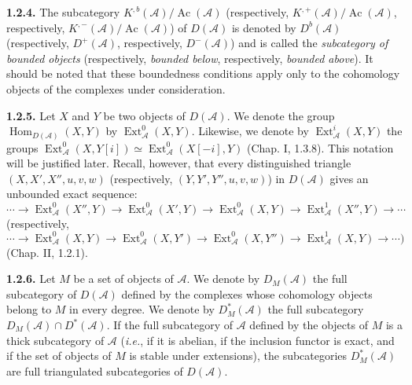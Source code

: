 \clearpage
{}%
\begingroup\small\setlength{\parskip}{0pt}\setlength{\emergencystretch}{1.5em}
\setlength{\abovedisplayskip}{4pt plus 2pt minus 2pt}%
\setlength{\belowdisplayskip}{4pt plus 2pt minus 2pt}%

\noindent\textbf{1.2.4.}\quad
The subcategory $K^{,b}(\mathcal A)/\operatorname{Ac}(\mathcal A)$
(respectively, $K^{,+}(\mathcal A)/\operatorname{Ac}(\mathcal A)$,
respectively, $K^{,-}(\mathcal A)/\operatorname{Ac}(\mathcal A)$) of
$D(\mathcal A)$ is denoted by $D^b(\mathcal A)$ (respectively,
$D^+(\mathcal A)$, respectively, $D^-(\mathcal A)$) and is called the
\emph{subcategory of bounded objects} (respectively, \emph{bounded below},
respectively, \emph{bounded above}). It should be noted that these
boundedness conditions apply only to the cohomology objects of the complexes
under consideration.

\medskip\noindent\textbf{1.2.5.}\quad
Let $X$ and $Y$ be two objects of $D(\mathcal A)$. We denote the group
$\operatorname{Hom}_{D(\mathcal A)}(X,Y)$ by
$\operatorname{Ext}_{\mathcal A}^{0}(X,Y)$. Likewise, we denote by
$\operatorname{Ext}_{\mathcal A}^{i}(X,Y)$ the groups
$\operatorname{Ext}_{\mathcal A}^{0}(X,Y[i])\simeq
\operatorname{Ext}_{\mathcal A}^{0}(X[-i],Y)$ (Chap. I, 1.3.8). This
notation will be justified later. Recall, however, that every distinguished
triangle $(X,X',X'',u,v,w)$ (respectively, $(Y,Y',Y'',u,v,w)$) in
$D(\mathcal A)$ gives an unbounded exact sequence:
\[
\cdots\longrightarrow \operatorname{Ext}_{\mathcal A}^{0}(X'',Y)
\longrightarrow \operatorname{Ext}_{\mathcal A}^{0}(X',Y)
\longrightarrow \operatorname{Ext}_{\mathcal A}^{0}(X,Y)
\longrightarrow \operatorname{Ext}_{\mathcal A}^{1}(X'',Y)
\longrightarrow\cdots
\]
(respectively,
\[
\cdots\longrightarrow \operatorname{Ext}_{\mathcal A}^{0}(X,Y)
\longrightarrow \operatorname{Ext}_{\mathcal A}^{0}(X,Y')
\longrightarrow \operatorname{Ext}_{\mathcal A}^{0}(X,Y'')
\longrightarrow \operatorname{Ext}_{\mathcal A}^{1}(X,Y)
\longrightarrow\cdots )
\]
(Chap. II, 1.2.1).

\medskip\noindent\textbf{1.2.6.}\quad
Let $M$ be a set of objects of $\mathcal A$. We denote by $D_M(\mathcal A)$
the full subcategory of $D(\mathcal A)$ defined by the complexes whose
cohomology objects belong to $M$ in every degree. We denote by
$D_M^*(\mathcal A)$ the full subcategory
$D_M(\mathcal A)\cap D^*(\mathcal A)$. If the full subcategory of
$\mathcal A$ defined by the objects of $M$ is a thick subcategory of
$\mathcal A$ (\textit{i.e.}, if it is abelian, if the inclusion functor is
exact, and if the set of objects of $M$ is stable under extensions), the
subcategories $D_M^*(\mathcal A)$ are full triangulated subcategories of
$D(\mathcal A)$.

